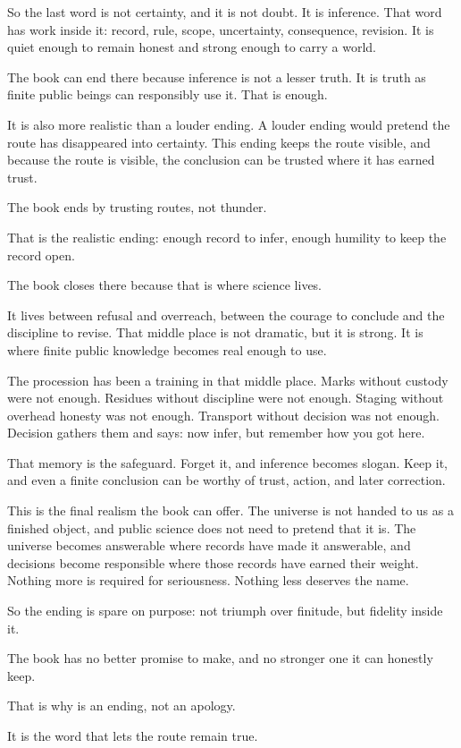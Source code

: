 \begin{movementclose}
So the last word is not certainty, and it is not doubt. It is inference. That
word has work inside it: record, rule, scope, uncertainty, consequence,
revision. It is quiet enough to remain honest and strong enough to carry a
world.

The book can end there because inference is not a lesser truth. It is truth
as finite public beings can responsibly use it. That is enough.

It is also more realistic than a louder ending. A louder ending would pretend
the route has disappeared into certainty. This ending keeps the route visible,
and because the route is visible, the conclusion can be trusted where it has
earned trust.

The book ends by trusting routes, not thunder.

That is the realistic ending: enough record to infer, enough humility to keep
the record open.

The book closes there because that is where science lives.

It lives between refusal and overreach, between the courage to conclude and
the discipline to revise. That middle place is not dramatic, but it is
strong. It is where finite public knowledge becomes real enough to use.

The procession has been a training in that middle place. Marks without
custody were not enough. Residues without discipline were not enough. Staging
without overhead honesty was not enough. Transport without decision was not
enough. Decision gathers them and says: now infer, but remember how you got
here.

That memory is the safeguard. Forget it, and inference becomes slogan. Keep
it, and even a finite conclusion can be worthy of trust, action, and later
correction.

This is the final realism the book can offer. The universe is not handed to us
as a finished object, and public science does not need to pretend that it
is. The universe becomes answerable where records have made it answerable,
and decisions become responsible where those records have earned their
weight. Nothing more is required for seriousness. Nothing less deserves the
name.

So the ending is spare on purpose: not triumph over finitude, but fidelity
inside it.

The book has no better promise to make, and no stronger one it can honestly
keep.

That is why  is an ending, not an apology.

It is the word that lets the route remain true.
\end{movementclose}
